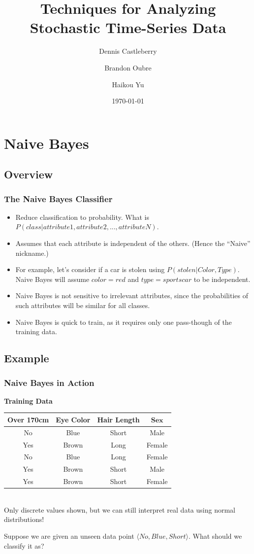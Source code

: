 \documentclass[mathserif]{beamer}
\begin{document}
	\title[Analyzing Stochastic Time-Series Data]{Techniques for Analyzing Stochastic Time-Series Data}
	\author[Castleberry \and Oubre \and Yu]{Dennis Castleberry \and Brandon Oubre \and Haikou Yu}
	\date{\today}
	\frame{\titlepage}
	
	\section{Naive Bayes}
	\subsection{Overview}
	\begin{frame}
		\frametitle{The Naive Bayes Classifier}
		\begin{itemize}
			\item Reduce classification to probability. What is \(P(class | attribute1, attribute2, ..., attributeN)\).
			\item Assumes that each attribute is independent of the others. (Hence the ``Naive'' nickname.)
			\item For example, let's consider if a car is stolen using \(P(stolen | Color, Type)\). Naive Bayes will assume \(color=red\) and \(type=sportscar\) to be independent.
			\item Naive Bayes is not sensitive to irrelevant attributes, since the probabilities of such attributes will be similar for all classes.
			\item Naive Bayes is quick to train, as it requires only one pass-though of the training data.
		\end{itemize}
	\end{frame}
	
	\subsection{Example}
	\begin{frame}
		\frametitle{Naive Bayes in Action}
		\begin{center} 
			\textbf{Training Data} \\
			\begin{tabular}{c | c | c || c}
				\textbf{Over 170cm} & \textbf{Eye Color} & \textbf{Hair Length} & \(\boxed{\textbf{Sex}}\) \\ \hline \hline
				No & Blue & Short & Male \\ \hline
				Yes & Brown & Long & Female \\ \hline
				No & Blue & Long & Female \\ \hline
				Yes & Brown & Short & Male \\ \hline
				Yes & Brown & Short & Female \\
			\end{tabular}  \\
			\small{Only discrete values shown, but we can still interpret real data using normal distributions!}
		\end{center}
			Suppose we are given an unseen data point \(\langle No, Blue, Short \rangle\). What should we classify it as?
	\end{frame}
	
\end{document}
